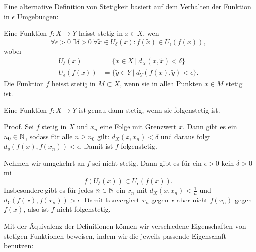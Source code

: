 Eine alternative Definition von Stetigkeit basiert auf dem Verhalten der Funktion in \(\epsilon\) Umgebungen:
\label{stetigkeit/stetigkeit:definition-3}
\begin{definition}{}{}



Eine Funktion \(f: X \rightarrow Y\) heisst stetig in \(x \in X\), wen
\begin{equation*}
 \forall \epsilon > 0 ~\exists \delta > 0 ~\forall \tilde{x} \in U_\delta(x): f(\tilde x) \in U_\epsilon(f(x)),
\end{equation*}
wobei
\begin{align*}
U_\delta(x) &= \{\tilde x \in X~|~d_X(x,\tilde x) < \delta \} \\
U_\epsilon(f(x)) &= \{\tilde y \in Y~|~d_Y(f(x),\tilde y) < \epsilon \}.
\end{align*}
Die Funktion \(f\) heisst stetig in \(M \subset X\), wenn sie in allen Punkten \(x\in M\) stetig ist.
\end{definition}
\label{stetigkeit/stetigkeit:theorem-4}
\begin{theorem}{}{}



Eine Funktion \(f: X \rightarrow Y\) ist genau dann stetig, wenn sie folgenstetig ist.
\end{theorem}

\begin{emphBox}{}{}
Proof.  Sei \(f\) stetig in \(X\) und \(x_n\) eine Folge mit Grenzwert \(x\). Dann gibt es ein \(n_0 \in \mathbb{N}\), sodass für alle \(n \geq n_0\) gilt: \( d_X(x,x_n) < \delta\) und daraus folgt \( d_y(f(x),f(x_n)) < \epsilon\). Damit ist \(f\) folgenstetig.

Nehmen wir umgekehrt an \(f\) sei nicht stetig. Dann gibt es für ein \(\epsilon > 0\) kein \(\delta > 0\) mi
\begin{equation*}
 f(U_\delta(x)) \subset U_\epsilon (f(x)).
\end{equation*}
Insbesondere gibt es für jedes \(n \in \mathbb{N}\) ein \(x_n\) mit \(d_X(x,x_n) < \frac{1}n\) und \(d_Y(f(x),f(x_n)) > \epsilon\). Damit konvergiert \(x_n\) gegen \(x\) aber nicht \(f(x_n)\) gegen \(f(x)\), also ist \(f\) nicht folgenstetig.
\end{emphBox}

Mit der Äquivalenz der Definitionen können wir verschiedene Eigenschaften von stetigen Funktionen beweisen, indem wir die jeweils passende Eigenschaft benutzen:
\label{stetigkeit/stetigkeit:theorem-5}
\begin{theorem}{}{}


\end{theorem}

